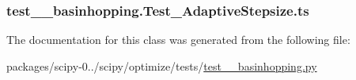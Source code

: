 \subsubsection[{ts}]{\setlength{\rightskip}{0pt plus 5cm}test\+\_\+\+\_\+basinhopping.\+Test\+\_\+\+Adaptive\+Stepsize.\+ts}\label{classtest____basinhopping_1_1Test__AdaptiveStepsize_a107dbcfa1d8b1400e4fbc8dbd631cbe5}


The documentation for this class was generated from the following file\+:\begin{DoxyCompactItemize}
\item 
packages/scipy-\/0../scipy/optimize/tests/\hyperlink{test____basinhopping_8py}{test\+\_\+\+\_\+basinhopping.\+py}\end{DoxyCompactItemize}
